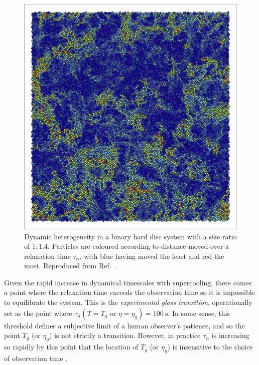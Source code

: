 \documentclass[11pt,twoside]{report}
\begin{document}
\begin{figure}
  \includegraphics[width=0.7\linewidth,outer]{dynamic-heterogeneity}
  \caption[Dynamic heterogeneity in binary hard discs]{
    Dynamic heterogeneity in a binary hard disc system with a size ratio of $1:1.4$.
    Particles are coloured according to distance moved over a relaxation time $\tau_\alpha$, with blue having moved the least and red the most.
    Reproduced from Ref.\ \cite{RoyallPR2015}.
  }
  \label{fig:dynamic-heterogeneities}
\end{figure}

Given the rapid increase in dynamical timescales with supercooling, there comes a point where the relaxation time exceeds the observation time so it is impossible to equilibrate the system.
This is the \emph{experimental glass transition}, operationally set as the point where $\tau_\alpha(T = T_g \textrm{ or } \eta = \eta_g) = \SI{100}{\second}$.
In some sense, this threshold defines a subjective limit of a human observer's patience, and so the point $T_g$ (or $\eta_g$) is not strictly a transition.
However, in practice $\tau_\alpha$ is increasing so rapidly by this point that the location of $T_g$ (or $\eta_g$) is insensitive to the choice of observation time \cite{CavagnaPR2009}.
\end{document}
